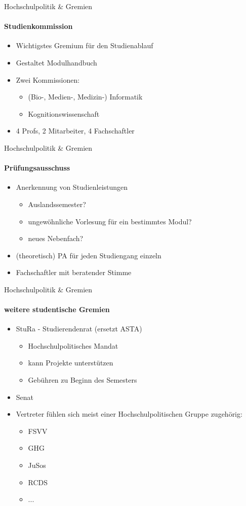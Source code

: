 \documentclass{beamer}
\begin{document}
	\begin{frame}{Hochschulpolitik \& Gremien}
		\framesubtitle{Studienkommission}
	 	\begin{itemize}
	 		\item Wichtigstes Gremium für den Studienablauf
	 		\item Gestaltet Modulhandbuch
	 		\item Zwei Kommissionen:
	 			\begin{itemize}
	 				\item (Bio-, Medien-, Medizin-) Informatik
	 				\item Kognitionswissenschaft
	 			\end{itemize}
	 		\item 4 Profs, 2 Mitarbeiter, 4 Fachschaftler\\
	 	\end{itemize}
	 \end{frame}
	
	\begin{frame}{Hochschulpolitik \& Gremien}
		\framesubtitle{Prüfungsausschuss}
	 	\begin{itemize}
	 		\item Anerkennung von Studienleistungen
	 			\begin{itemize}
	 				\item Auslandssemester?
	 				\item ungewöhnliche Vorlesung für ein bestimmtes Modul?
	 				\item neues Nebenfach?
	 			\end{itemize}
	 		\item (theoretisch) PA für jeden Studiengang einzeln
	 		\item Fachschaftler mit beratender Stimme
	 	\end{itemize}
	 \end{frame}
	
	\begin{frame}{Hochschulpolitik \& Gremien}
		\framesubtitle{weitere studentische Gremien}
	 	\begin{itemize}
	 		\item StuRa - Studierendenrat (ersetzt ASTA)
	 			\begin{itemize}
	 				\item Hochschulpolitisches Mandat
	 				\item kann Projekte unterstützen
	 				\item Gebühren zu Beginn des Semesters
	 			\end{itemize}
	 		\item Senat
	 		\item Vertreter fühlen sich meist einer Hochschulpolitischen Gruppe zugehörig:
	 			\begin{itemize}
	 				\item FSVV
	 				\item GHG
	 				\item JuSos
	 				\item RCDS
	 				\item ...
	 			\end{itemize}
	 	\end{itemize}
	 \end{frame}
	
\end{document}
